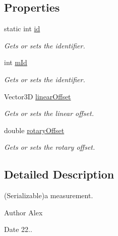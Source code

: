 \subsection*{Properties}
\begin{DoxyCompactItemize}
\item 
static int \hyperlink{class_l_i_d_a_r___w_p_f___t_e_s_t_1_1_measurement_acef1860574df9ec13ba38c5b530fd2b3}{id}
\begin{DoxyCompactList}\small\item\em Gets or sets the identifier. \end{DoxyCompactList}\item 
int \hyperlink{class_l_i_d_a_r___w_p_f___t_e_s_t_1_1_measurement_aca7cf93485898f63b544f86b724a4f8d}{m\+Id}
\begin{DoxyCompactList}\small\item\em Gets or sets the identifier. \end{DoxyCompactList}\item 
Vector3\+D \hyperlink{class_l_i_d_a_r___w_p_f___t_e_s_t_1_1_measurement_a9a2cf4d11bf826c96533fcaae3bcc4a4}{linear\+Offset}
\begin{DoxyCompactList}\small\item\em Gets or sets the linear offset. \end{DoxyCompactList}\item 
double \hyperlink{class_l_i_d_a_r___w_p_f___t_e_s_t_1_1_measurement_a711a9fb756fea70444b65523eab7d9fd}{rotary\+Offset}
\begin{DoxyCompactList}\small\item\em Gets or sets the rotary offset. \end{DoxyCompactList}\end{DoxyCompactItemize}


\subsection{Detailed Description}
(Serializable)a measurement. 

\begin{DoxyAuthor}{Author}
Alex 
\end{DoxyAuthor}
\begin{DoxyDate}{Date}
22.. 
\end{DoxyDate}


